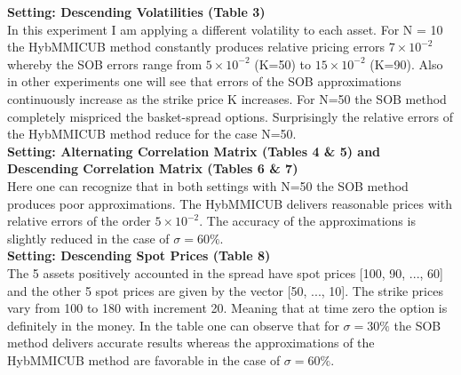 \documentclass[a4paper]{article}
\begin{document}
\newpage
{
\textbf{Setting: Descending Volatilities (Table 3)}\\
}
In this experiment I am applying a different volatility to each asset. For N = 10 the HybMMICUB method constantly produces relative pricing errors  $7\times10^{-2}$ whereby the SOB errors range from $5\times10^{-2}$ (K=50)  to $15\times10^{-2}$ (K=90). Also in other experiments one will see that errors of the SOB approximations continuously increase as the strike price K increases. For N=50 the SOB method completely mispriced the basket-spread options. Surprisingly the relative errors of the HybMMICUB method reduce for the case N=50. \\

{
\textbf{Setting: Alternating Correlation Matrix (Tables 4 \& 5) and Descending Correlation Matrix (Tables 6 \& 7)}\\
}
Here one can recognize that in both settings with N=50 the SOB method produces poor approximations. The HybMMICUB delivers reasonable prices with relative errors of the order $5\times10^{-2}$. The accuracy of the approximations is slightly reduced in the case of $\sigma=60\%.$\\

{
\textbf{Setting: Descending Spot Prices (Table 8)}\\
}
The 5 assets positively accounted in the spread have spot prices [100, 90, ..., 60] and the other 5 spot prices are given by the vector [50, ..., 10]. The strike prices vary from 100 to 180 with increment 20. Meaning that at time zero the option is definitely in the money. In the table one can observe that for $\sigma = 30\%$ the SOB method delivers accurate results whereas the approximations of the HybMMICUB method are favorable in the case of $\sigma = 60\%.$

\newpage
\end{document}
